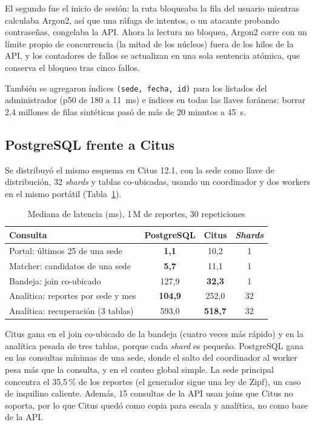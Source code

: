 \documentclass[conference]{IEEEtran}
\newcommand{\pc}{\,\%}
\begin{document}
El segundo fue el inicio de sesión: la ruta bloqueaba la fila del usuario mientras calculaba Argon2, así que una ráfaga de intentos, o un atacante probando contraseñas, congelaba la API. Ahora la lectura no bloquea, Argon2 corre con un límite propio de concurrencia (la mitad de los núcleos) fuera de los hilos de la API, y los contadores de fallos se actualizan en una sola sentencia atómica, que conserva el bloqueo tras cinco fallos.

También se agregaron índices \texttt{(sede, fecha, id)} para los listados del administrador (p50 de 180 a 11~ms) e índices en todas las llaves foráneas: borrar 2,4 millones de filas sintéticas pasó de más de 20 minutos a 45~s.

\subsection{PostgreSQL frente a Citus}
Se distribuyó el mismo esquema en Citus 12.1, con la sede como llave de distribución, 32 \emph{shards} y tablas co-ubicadas, usando un coordinador y dos workers en el mismo portátil (Tabla~\ref{tab:citus}).

\begin{table}[t]
\centering
\caption{Mediana de latencia (ms), 1\,M de reportes, 30 repeticiones}
\label{tab:citus}
\begin{tabular}{@{}lccc@{}}
\toprule
Consulta & PostgreSQL & Citus & \emph{Shards} \\
\midrule
Portal: últimos 25 de una sede & \textbf{1,1} & 10,2 & 1 \\
Matcher: candidatos de una sede & \textbf{5,7} & 11,1 & 1 \\
Bandeja: join co-ubicado & 127,9 & \textbf{32,3} & 1 \\
Analítica: reportes por sede y mes & \textbf{104,9} & 252,0 & 32 \\
Analítica: recuperación (3 tablas) & 593,0 & \textbf{518,7} & 32 \\
\bottomrule
\end{tabular}
\end{table}

Citus gana en el join co-ubicado de la bandeja (cuatro veces más rápido) y en la analítica pesada de tres tablas, porque cada \emph{shard} es pequeño. PostgreSQL gana en las consultas mínimas de una sede, donde el salto del coordinador al worker pesa más que la consulta, y en el conteo global simple. La sede principal concentra el 35,5\pc{} de los reportes (el generador sigue una ley de Zipf), un caso de inquilino caliente. Además, 15 consultas de la API usan joins que Citus no soporta, por lo que Citus quedó como copia para escala y analítica, no como base de la API.
\end{document}
